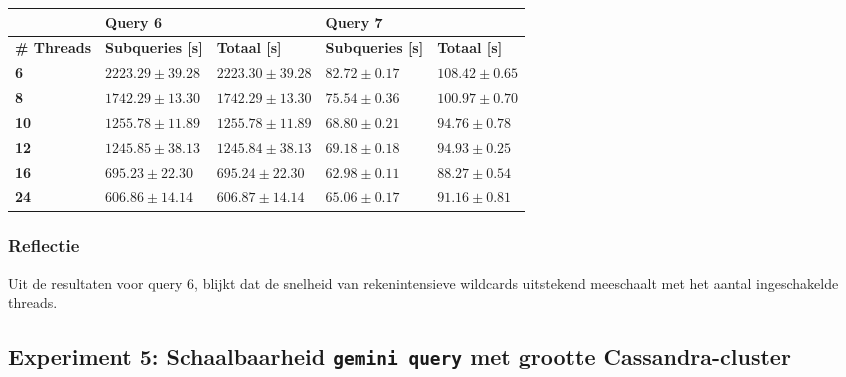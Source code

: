 \begin{table}[!h]

\begin{tabular}{@{}lllll@{}}
\cmidrule(l){2-5}
                                       & \multicolumn{2}{|l|}{\textbf{Query 6}}                                                      & \multicolumn{2}{l|}{\textbf{Query 7}}                             \\ 
\midrule
\multicolumn{1}{|l|}{\textbf{\# Threads}}  & \multicolumn{1}{l|}{\textbf{Subqueries [s]}}               & \multicolumn{1}{l|}{\textbf{Totaal [s]}} & \multicolumn{1}{l|}{\textbf{Subqueries [s]}} & \multicolumn{1}{l|}{\textbf{Totaal [s]}} \\ \midrule
\multicolumn{1}{|l|}{\textbf{6}} & \multicolumn{1}{l|}{$2223.29 \pm 39.28$} & \multicolumn{1}{l|}{$2223.30 \pm 39.28$}             & \multicolumn{1}{l|}{$82.72 \pm 0.17$}          & \multicolumn{1}{l|}{$108.42 \pm 0.65$}                        \\
\multicolumn{1}{|l|}{\textbf{8}} & \multicolumn{1}{l|}{$1742.29 \pm 13.30$} &\multicolumn{1}{l|}{$1742.29 \pm 13.30$}            & \multicolumn{1}{l|}{$75.54 \pm 0.36$}          & \multicolumn{1}{l|}{$100.97 \pm 0.70$}                        \\
\multicolumn{1}{|l|}{\textbf{10}} & \multicolumn{1}{l|}{$1255.78 \pm 11.89$} &\multicolumn{1}{l|}{$1255.78 \pm 11.89$}            & \multicolumn{1}{l|}{$68.80 \pm 0.21$}            & \multicolumn{1}{l|}{$94.76 \pm 0.78$}                        \\
\multicolumn{1}{|l|}{\textbf{12}} & \multicolumn{1}{l|}{$1245.85 \pm 38.13$} &\multicolumn{1}{l|}{$1245.84 \pm 38.13$}            & \multicolumn{1}{l|}{$69.18 \pm 0.18$}           & \multicolumn{1}{l|}{$94.93 \pm 0.25$}                        \\
\multicolumn{1}{|l|}{\textbf{16}} & \multicolumn{1}{l|}{$695.23  \pm 22.30$} &\multicolumn{1}{l|}{$695.24 \pm 22.30$}                 & \multicolumn{1}{l|}{$62.98 \pm 0.11$}                    & \multicolumn{1}{l|}{$88.27 \pm 0.54$}                        \\
\multicolumn{1}{|l|}{\textbf{24}} & \multicolumn{1}{l|}{$606.86 \pm 14.14$} &\multicolumn{1}{l|}{$606.87 \pm 14.14$}          & \multicolumn{1}{l|}{$65.06 \pm 0.17$}           & \multicolumn{1}{l|}{$91.16 \pm 0.81$}                        \\
\bottomrule
\end{tabular}
\end{table}

\subsubsection{Reflectie}

Uit de resultaten voor query 6, blijkt dat de snelheid van rekenintensieve wildcards uitstekend meeschaalt met het aantal ingeschakelde threads.  

\subsection{Experiment 5: Schaalbaarheid \texttt{gemini query} met grootte Cassandra-cluster}
\label{exp5}

